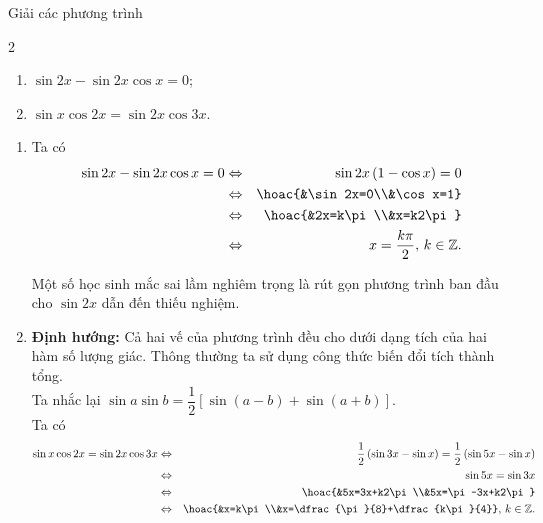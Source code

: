 \begin{bt}%
	Giải các phương trình
	\begin{multicols}{2}
		\begin{enumerate}
			\item $\sin 2x-\sin 2x\cos x=0$;
			\item $\sin x\cos 2x=\sin 2x\cos 3x$.
		\end{enumerate}
	\end{multicols}
	\loigiai 
	{
		\begin{enumerate}
			\item Ta có
			\allowdisplaybreaks
			\begin{eqnarray*}
				\sin 2x-\sin 2x\cos x=0&\Leftrightarrow&\sin 2x\left(1-\cos x\right)=0\\
				&\Leftrightarrow&\hoac{&\sin 2x=0\\&\cos x=1}\\
				&\Leftrightarrow&\hoac{&2x=k\pi\\&x=k2\pi}\\
				&\Leftrightarrow& x=\dfrac{k\pi}{2},\, k\in\mathbb{Z}.
			\end{eqnarray*}
		\begin{luuy}
			Một số học sinh mắc sai lầm nghiêm trọng là rút gọn phương trình ban đầu cho $\sin 2x$ dẫn đến thiếu nghiệm.
		\end{luuy}
			\item \textbf{Định hướng:} Cả hai vế của phương trình đều cho dưới dạng tích của hai hàm số lượng giác. Thông thường ta sử dụng công thức biến đổi tích thành tổng.\\
			Ta nhắc lại $\sin a\sin b=\dfrac{1}{2}\left[\sin (a-b)+\sin(a+b)\right]$.\\
			Ta có
			\allowdisplaybreaks
			\begin{eqnarray*}
				\sin x\cos 2x=\sin 2x\cos 3x&\Leftrightarrow&\dfrac{1}{2}\left(\sin 3x-\sin x\right)=\dfrac{1}{2}\left(\sin 5x-\sin x\right)\\
				&\Leftrightarrow&\sin 5x=\sin 3x\\
				&\Leftrightarrow& \hoac{&5x=3x+k2\pi\\&5x=\pi-3x+k2\pi}\\
				&\Leftrightarrow&\hoac{&x=k\pi\\&x=\dfrac{\pi}{8}+\dfrac{k\pi}{4}},\, k\in\mathbb{Z}.
			\end{eqnarray*}
		\end{enumerate}
	}
\end{bt}

